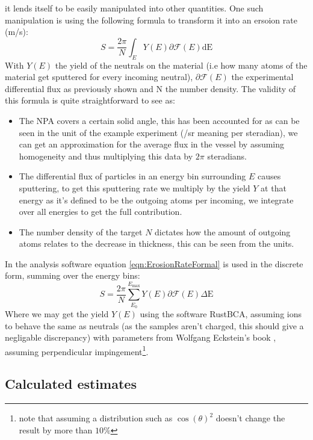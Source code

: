 \documentclass{article}
\begin{document}
it lends itself to be easily manipulated into other quantities. One such manipulation
is using the following formula to transform it into an ersoion rate (m/s):
\begin{equation}
    S = \frac{2\pi}{N} \int_E Y(E)\partial\mathcal{F} (E) \text{dE}
    \label{eqn:ErosionRateFormal}
\end{equation}
With $Y(E)$ the yield of the neutrals on the material (i.e how many atoms of
the material get sputtered for every incoming neutral), $\partial\mathcal{F}(E)$ the
experimental differential flux as previously shown and N the number density.
The validity of this formula is quite straightforward to see as:
\begin{itemize}
    \item The NPA covers a certain solid angle, this has been accounted for as
        can be seen in the unit of the example experiment (/sr meaning per
        steradian), we can get an approximation for the average
        flux in the vessel by assuming homogeneity and thus multiplying this
data by $2\pi$ steradians. 
    \item The differential flux of particles in an energy bin surrounding $E$ causes sputtering, to get this
        sputtering rate we multiply by the yield $Y$ at that energy as it's defined to be the
        outgoing atoms per incoming, we integrate over all energies to get the
        full contribution. 
    \item The number density of the target $N$ dictates how the amount of
        outgoing atoms relates to the decrease in thickness, this can be seen from the units.
\end{itemize}
In the analysis software equation \ref{eqn:ErosionRateFormal} is used in the discrete form,
summing over the energy bins:
\begin{equation}
S = \frac{2\pi}{N}\sum_{E_0}^{E_{\text{max}}} Y(E)\partial\mathcal{F}(E)\Delta\text{E}
    \label{eqn:ErosionRateFinite}
\end{equation}
Where we may get the yield $Y(E)$ using the software RustBCA\cite{RustBCA},
assuming ions to behave the same as neutrals (as the samples aren't charged,
this should give a negligable discrepancy) with parameters from Wolfgang Eckstein's
book \cite{eckstein2013computer}, assuming perpendicular impingement\footnote{note that
assuming a distribution such as $\cos(\theta)^2$ doesn't change the result by more than $10\%$}.
\subsection{Calculated estimates}
\end{document}
